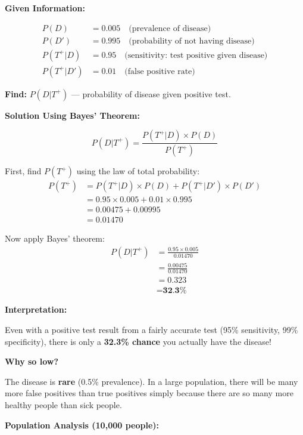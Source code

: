 \documentclass[11pt,a4paper]{article}
\begin{document}
\begin{answer}
\textbf{Given Information:}

\begin{align*}
P(D) &= 0.005 \quad \text{(prevalence of disease)}\\
P(D') &= 0.995 \quad \text{(probability of not having disease)}\\
P(T^+|D) &= 0.95 \quad \text{(sensitivity: test positive given disease)}\\
P(T^+|D') &= 0.01 \quad \text{(false positive rate)}
\end{align*}

\textbf{Find:} $P(D|T^+)$ — probability of disease given positive test.

\vspace{0.3cm}
\textbf{Solution Using Bayes' Theorem:}

\[
P(D|T^+) = \frac{P(T^+|D) \times P(D)}{P(T^+)}
\]

First, find $P(T^+)$ using the law of total probability:
\begin{align}
P(T^+) &= P(T^+|D) \times P(D) + P(T^+|D') \times P(D')\\
&= 0.95 \times 0.005 + 0.01 \times 0.995\\
&= 0.00475 + 0.00995\\
&= 0.01470
\end{align}

Now apply Bayes' theorem:
\begin{align}
P(D|T^+) &= \frac{0.95 \times 0.005}{0.01470}\\
&= \frac{0.00475}{0.01470}\\
&= 0.323\\
&= \textbf{32.3\%}
\end{align}

\vspace{0.3cm}
\textbf{Interpretation:}

Even with a positive test result from a fairly accurate test (95\% sensitivity, 99\% specificity), there is only a \textbf{32.3\% chance} you actually have the disease!

\vspace{0.3cm}
\textbf{Why so low?}

The disease is \textbf{rare} (0.5\% prevalence). In a large population, there will be many more false positives than true positives simply because there are so many more healthy people than sick people.

\newpage
\textbf{Population Analysis (10,000 people):}


\end{answer}
\end{document}
